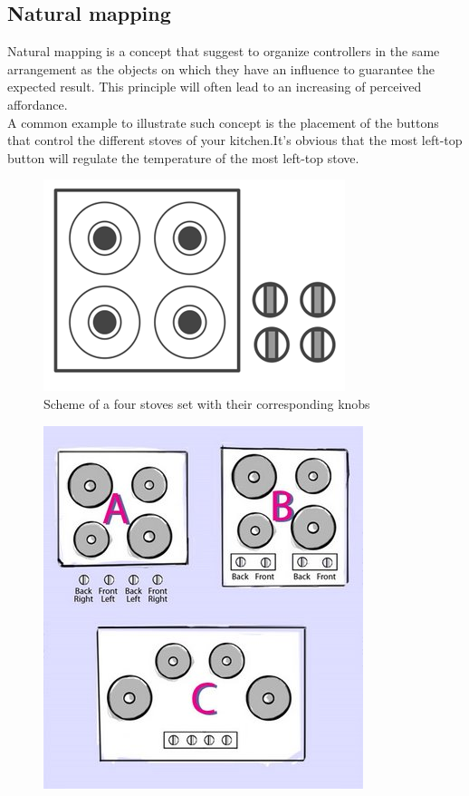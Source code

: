 \documentclass[a4paper,11pt] {article}
\theoremstyle{definition}
\begin{document}
\subsection{Natural mapping}
Natural mapping is a concept that suggest to organize controllers in the same arrangement as the objects on which they have an influence to guarantee the expected result. This principle will often lead to an increasing of perceived affordance.\\

A common example to illustrate such concept is the placement of the buttons that control the different stoves of your kitchen.It's obvious that the most left-top button will regulate the temperature of the most left-top stove.\\
 \begin{minipage}{\linewidth}
      \centering
      \begin{minipage}{0.45\linewidth}
          \begin{figure}[H]
          \centering
              \includegraphics[scale=0.3]{stove_natural.png}
              \caption{Scheme of a four stoves set with their corresponding knobs}
          \end{figure}
      \end{minipage}
      \hspace{0.05\linewidth}
      \begin{minipage}{0.45\linewidth}
          \begin{figure}[H]
                    \centering
              \includegraphics[scale=0.4]{NormanBurners.jpg}

\end{figure}
\end{minipage}
\end{minipage}
\end{document}
